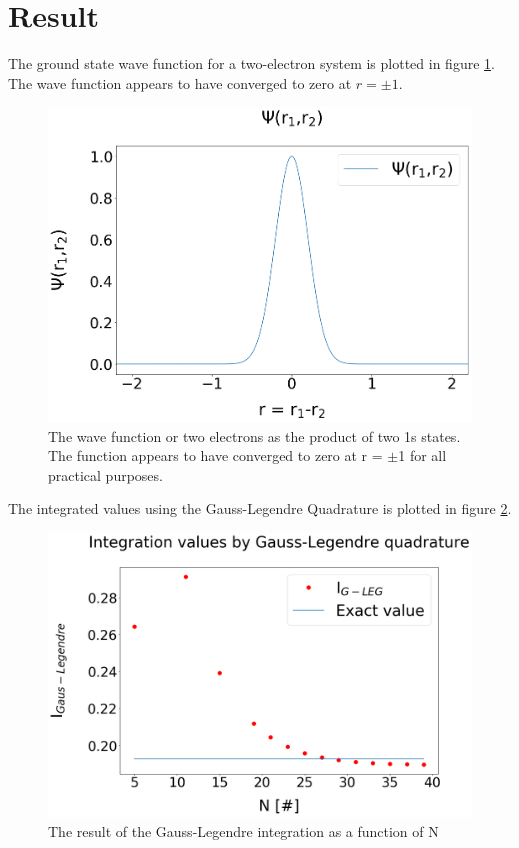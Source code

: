\documentclass[%
reprint,
amsmath,amssymb,
aps,
]{revtex4-1}
\begin{document}
\section{Result} \noindent 
The ground state wave function for a two-electron system is plotted in figure \ref{wavefigure}. The wave function appears to have converged to zero at $r = \pm 1$. 
\begin{figure}[!h]
	\includegraphics[scale = 0.24]{Wavefunction.png}
	\caption{\label{wavefigure} The wave function or two electrons as the product of two 1s states. The function appears to have converged to zero at r = $\pm$1 for all practical purposes.}
\end{figure}
The integrated values using the Gauss-Legendre Quadrature is plotted in figure \ref{integrated_results}.
\begin{figure}[!h]
	\includegraphics[scale = 0.24]{Gauss_Legendre.png}
	\caption{\label{integrated_results} The result of the Gauss-Legendre integration as a function of N}
\end{figure}
\end{document}
